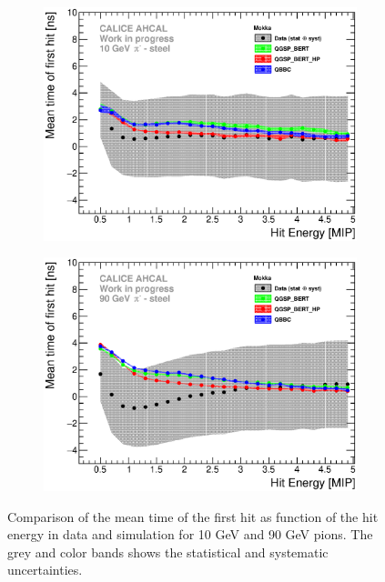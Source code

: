 \begin{figure}[htbp!]
	\begin{subfigure}[t]{0.49\textwidth}
		\centering
		\includegraphics[width=1\textwidth]{../Thesis_Plots/Timing/Pions/Plots/ComparisonToSim/Time_Energy_10GeV_Mokka.eps}
		\caption{} \label{fig:Energy_SimData_10GeV}
	\end{subfigure}
	\hfill
	\begin{subfigure}[t]{0.49\textwidth}
		\centering
		\includegraphics[width=1\textwidth]{../Thesis_Plots/Timing/Pions/Plots/ComparisonToSim/Time_Energy_90GeV_Mokka.eps}
		\caption{} \label{fig:Energy_SimData_90GeV}
	\end{subfigure}
	\caption{Comparison of the mean time of the first hit as function of the hit energy in data and \mokka simulation for 10 GeV and 90 GeV pions. The grey and color bands shows the statistical and systematic uncertainties.}
\end{figure}

